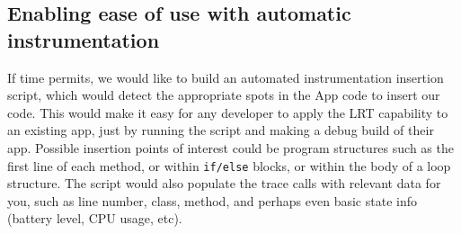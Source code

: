 \subsection{Enabling ease of use with automatic instrumentation}
If time permits, we would like to build an automated instrumentation insertion 
script, which would detect the appropriate spots in the App code to insert our 
code. This would make it easy for any developer to apply the LRT capability to
an existing app, just by running the script and making a debug build of their 
app. Possible insertion points of interest could be program structures such as the first
line of each method, or within \texttt{if/else} blocks, or within the body of
a loop structure. The script would also populate the trace calls with relevant data
for you, such as line number, class, method, and perhaps even basic state info (battery
level, CPU usage, etc).


